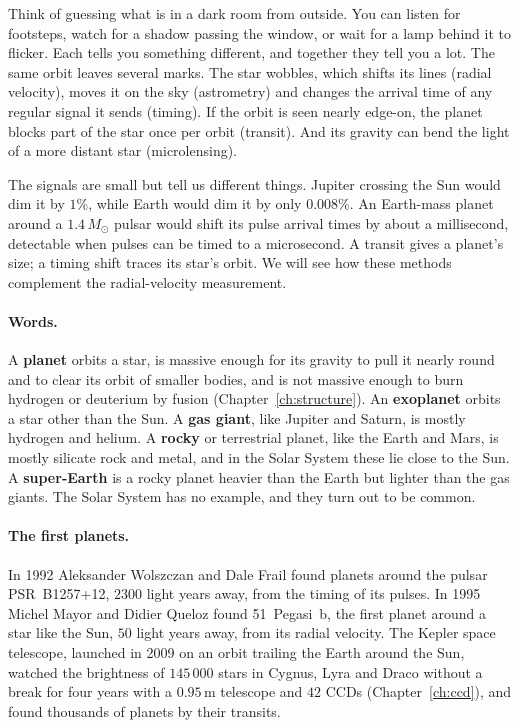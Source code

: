 Think of guessing what is in a dark room from outside. You can listen for footsteps, watch for a shadow passing the window, or wait for a lamp behind it to flicker. Each tells you something different, and together they tell you a lot. The same orbit leaves several marks. The star wobbles, which shifts its lines (radial velocity), moves it on the sky (astrometry) and changes the arrival time of any regular signal it sends (timing). If the orbit is seen nearly edge-on, the planet blocks part of the star once per orbit (transit). And its gravity can bend the light of a more distant star (microlensing).

	The signals are small but tell us different things. Jupiter crossing the Sun would dim it by $1\%$, while Earth would dim it by only $0.008\%$. An Earth-mass planet around a $1.4\,M_\odot$ pulsar would shift its pulse arrival times by about a millisecond, detectable when pulses can be timed to a microsecond. A transit gives a planet's size; a timing shift traces its star's orbit. We will see how these methods complement the radial-velocity measurement.

\paragraph{Words.} A \textbf{planet} orbits a star, is massive enough for its gravity to pull it nearly round and to clear its orbit of smaller bodies, and is not massive enough to burn hydrogen or deuterium by fusion (Chapter~\ref{ch:structure}). An \textbf{exoplanet} orbits a star other than the Sun. A \textbf{gas giant}, like Jupiter and Saturn, is mostly hydrogen and helium. A \textbf{rocky} or terrestrial planet, like the Earth and Mars, is mostly silicate rock and metal, and in the Solar System these lie close to the Sun. A \textbf{super-Earth} is a rocky planet heavier than the Earth but lighter than the gas giants. The Solar System has no example, and they turn out to be common.

\paragraph{The first planets.} In 1992 Aleksander Wolszczan and Dale Frail found planets around the pulsar PSR~B1257+12, $2300$ light years away, from the timing of its pulses. In 1995 Michel Mayor and Didier Queloz found 51~Pegasi~b, the first planet around a star like the Sun, $50$ light years away, from its radial velocity. The Kepler space telescope, launched in 2009 on an orbit trailing the Earth around the Sun, watched the brightness of $145\,000$ stars in Cygnus, Lyra and Draco without a break for four years with a $0.95\,\mathrm m$ telescope and $42$ CCDs (Chapter~\ref{ch:ccd}), and found thousands of planets by their transits.

